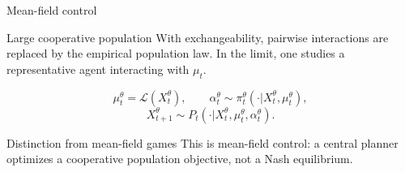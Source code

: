 \documentclass[9pt]{beamer}
\newcommand{\Law}{\mathcal L}
\begin{document}
\begin{frame}{Mean-field control}

\begin{block}{Large cooperative population}
With exchangeability, pairwise interactions are replaced by the empirical population law. In the limit, one studies a representative agent interacting with $\mu_t$.
\end{block}
\[
  \mu_t^\theta = \Law(X_t^\theta),\qquad
  \alpha_t^\theta\sim\pi_t^\theta(\cdot|X_t^\theta,\mu_t^\theta),
\]
\[
  X_{t+1}^\theta\sim P_t(\cdot|X_t^\theta,\mu_t^\theta,\alpha_t^\theta).
\]
\begin{center}
\end{center}

\begin{alertblock}{Distinction from mean-field games}
This is mean-field control: a central planner optimizes a cooperative population objective, not a Nash equilibrium.
\end{alertblock}
\end{frame}
\end{document}
